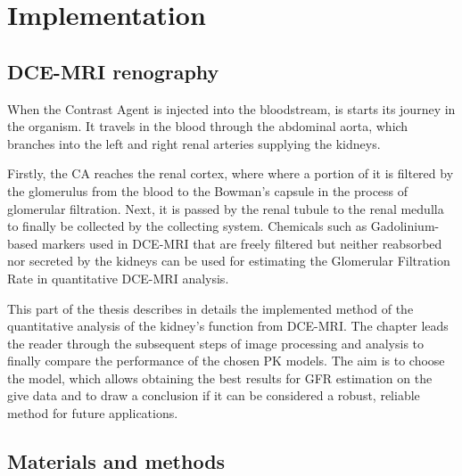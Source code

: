 \chapter{Implementation}
\section{DCE-MRI renography}
When the Contrast Agent is injected into the bloodstream, is starts its journey in the organism. It travels in the blood through the abdominal aorta, which branches  into the left and right renal arteries supplying the kidneys.  

Firstly, the CA reaches the renal cortex, where where a portion of it is filtered by the glomerulus from the blood to the Bowman's capsule in the process of glomerular filtration. Next, it is passed by the renal tubule to the renal medulla to finally be collected by the collecting system.   
Chemicals such as Gadolinium-based markers used in DCE-MRI that are freely filtered but neither reabsorbed nor secreted by the kidneys can be used for estimating the Glomerular Filtration Rate in quantitative DCE-MRI analysis.

This part of the thesis describes in details the implemented method of the quantitative analysis of the kidney's function from DCE-MRI. The chapter leads the reader through the subsequent steps of image processing and analysis to finally compare the performance of the chosen PK models. The aim is to choose the model, which allows obtaining the best results for GFR estimation on the give data and to draw a conclusion if it can be considered a robust, reliable method for future applications. 

\section{Materials and methods}
